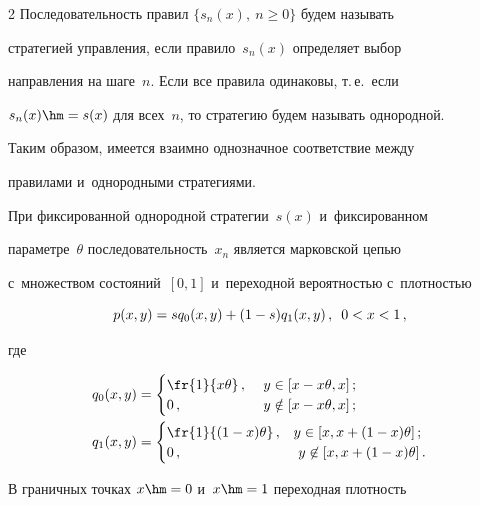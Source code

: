 \begin{multicols}{2}
  Последовательность правил $\{ s_n(x),\ n\geq 0\}$ будем называть 


стратегией управ\-ле\-ния, если правило~$s_n(x)$ определяет выбор 


направления на шаге~$n$. Если все правила одинаковы, т.\,е.\ если 


$s_n(x)\hm= s(x)$ для всех~$n$, то стратегию будем называть однородной. 


Таким образом, имеется взаимно однозначное соответствие меж\-ду 


правилами и~однородными стратегиями.


  


  При фиксированной однородной стратегии~$s(x)$ и~фиксированном 


па\-ра\-мет\-ре~$\theta$ по\-сле\-до\-ва\-тель\-ность~$x_n$ является марковской цепью 


с~множеством со\-сто\-яний~$[0,1]$ и~переходной ве\-ро\-ят\-ностью с~плот\-ностью


  \begin{equation}


  p(x,y) =sq_0(x,y)+(1-s)q_1(x,y)\,,\enskip 0<x<1\,,


  \label{e1-kr}


  \end{equation}


где


\begin{align*}


q_0(x,y) &= \begin{cases}


\fr{1}{x\theta}\,, &\ y\in [x-x\theta, x]\,;\\


0\,, &\  y\notin [x-x\theta,x]\,;


\end{cases}\\


q_1(x,y)&= \begin{cases}


\fr{1}{(1-x)\theta}\,, & y\in [x,x+(1-x)\theta]\,;\\


0\,, &\ y\not\in [x, x+(1-x)\theta]\,.


\end{cases}


\end{align*}


В граничных точках $x\hm=0$ и~$x\hm=1$ переходная плот\-ность 



\end{multicols}
